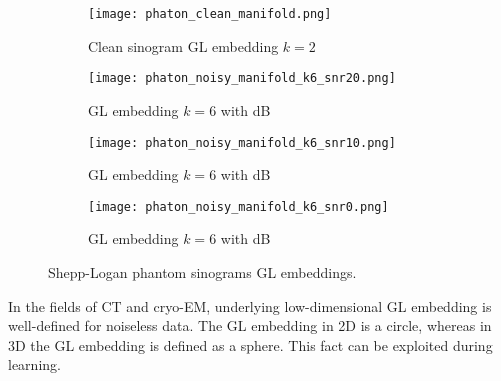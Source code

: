 \begin{figure}[H]
    \captionsetup[subfigure]{justification=centering}
    \centering
    \begin{subfigure}[t]{0.25\textwidth}
        \texttt{[image: phaton\_clean\_manifold.png]}
        \caption{Clean sinogram GL embedding $k=2$}
        \label{fig:clean_manifold}
    \end{subfigure}\hfill
    \begin{subfigure}[t]{0.25\textwidth}
      \texttt{[image: phaton\_noisy\_manifold\_k6\_snr20.png]}
      \caption{GL embedding $k=6$ with  dB}
      \label{fig:noisy_manifold_k6_snr20}
    \end{subfigure}\hfill
    \begin{subfigure}[t]{0.25\textwidth}
      \texttt{[image: phaton\_noisy\_manifold\_k6\_snr10.png]}
      \caption{GL embedding $k=6$ with  dB}
      \label{fig:noisy_manifold_k6_snr10}
    \end{subfigure}\hfill
    \begin{subfigure}[t]{0.25\textwidth}
      \texttt{[image: phaton\_noisy\_manifold\_k6\_snr0.png]}
      \caption{GL embedding $k=6$ with  dB}
      \label{fig:noisy_manifold_k6_snr0}
    \end{subfigure}
    \caption{Shepp-Logan phantom sinograms GL embeddings.}
    \label{fig:phantom_manifolds}
  \end{figure}

\begin{tcolorbox}[colback=red!5!white,colframe=red!75!black]
    In the fields of CT and cryo-EM, underlying low-dimensional GL embedding is well-defined for noiseless data.
    The GL embedding in 2D is a circle, whereas in 3D the GL embedding is defined as a sphere.
    This fact can be exploited during learning.
\end{tcolorbox}

